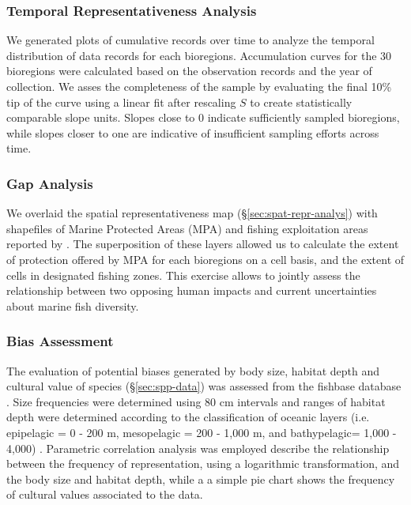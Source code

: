\documentclass[12pt,authoryear]{elsarticle}
\begin{document}
\subsubsection{Temporal Representativeness Analysis}
\label{sec:temp-repr-analys}
We generated plots of cumulative records over time to analyze the temporal distribution of data records for each bioregions. Accumulation curves for the 30 bioregions were calculated based on the observation records and the year of collection. We asses the completeness of the sample by evaluating the final 10\% tip of the curve using a linear fit after rescaling $S$ to create statistically comparable slope units. Slopes close to 0 indicate sufficiently sampled bioregions, while slopes closer to one are indicative of insufficient sampling efforts across time.

\subsubsection{Gap Analysis}
\label{sec:gap-analysis}
We overlaid the spatial representativeness map (\S \ref{sec:spat-repr-analys}) with shapefiles of Marine Protected Areas (MPA) \citep{wcmc2022} and fishing exploitation areas reported by \citep{fao2014}. The superposition of these layers allowed us to calculate the extent of protection offered by MPA for each  bioregions on a cell basis, and the extent of cells in designated fishing zones. This exercise allows to jointly assess the relationship between two opposing human impacts and current uncertainties about marine fish diversity. 

\subsubsection{Bias Assessment}
\label{sec:bias-assessment}
The evaluation of potential biases generated by body size, habitat depth and cultural value of species (\S \ref{sec:spp-data}) was assessed from the fishbase database \citep{froese2021fishbase}. Size frequencies were determined using 80 cm intervals and ranges of habitat depth were determined according to the classification of oceanic layers (i.e. epipelagic = 0 - 200 m, mesopelagic = 200 - 1,000 m, and bathypelagic= 1,000 - 4,000) \citep{costello2010}. Parametric correlation analysis was employed describe the relationship between the frequency of representation, using a logarithmic transformation, and the body size and habitat depth, while a a simple pie chart shows the frequency of cultural values associated to the data.
\end{document}
